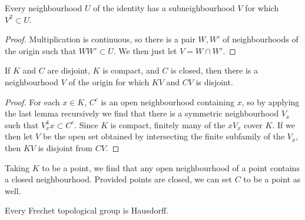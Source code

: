 \begin{lemma}
    Every neighbourhood $U$ of the identity has a subneighbourhood $V$ for which $V^2 \subset U$.
\end{lemma}
\begin{proof}
    Multiplication is continuous, so there is a pair $W, W'$ of neighbourhoods of the origin such that $WW' \subset U$. We then just let $V = W \cap W'$.
\end{proof}

\begin{theorem}
    If $K$ and $C$ are disjoint, $K$ is compact, and $C$ is closed, then there is a neighbourhood $V$ of the origin for which $KV$ and $CV$ is disjoint.
\end{theorem}
\begin{proof}
    For each $x \in K$, $C^c$ is an open neighbourhood containing $x$, so by applying the last lemma recursively we find that there is a symmetric neighbourhood $V_x$ such that $V_x^4 x \subset C^c$. Since $K$ is compact, finitely many of the $xV_x$ cover $K$. If we then let $V$ be the open set obtained by intersecting the finite subfamily of the $V_x$, then $KV$ is disjoint from $CV$.
\end{proof}

Taking $K$ to be a point, we find that any open neighbourhood of a point contains a closed neighbourhood. Provided points are closed, we can set $C$ to be a point as well.

\begin{corollary}
    Every Frechet topological group is Hausdorff.
\end{corollary}

